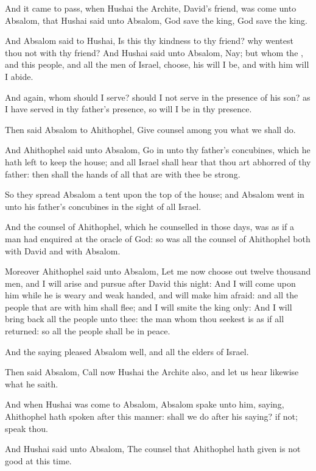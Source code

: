 \Verse And it came to pass, when Hushai the Archite, David's friend, was come unto Absalom, that Hushai said unto Absalom, God save the king, God save the king.

\Verse And Absalom said to Hushai, Is this thy kindness to thy friend?  why wentest thou not with thy friend?  \Verse And Hushai said unto Absalom, Nay; but whom the \LORD, and this people, and all the men of Israel, choose, his will I be, and with him will I abide.

\Verse And again, whom should I serve? should I not serve in the presence of his son? as I have served in thy father's presence, so will I be in thy presence.

\Verse Then said Absalom to Ahithophel, Give counsel among you what we shall do.

\Verse And Ahithophel said unto Absalom, Go in unto thy father's concubines, which he hath left to keep the house; and all Israel shall hear that thou art abhorred of thy father: then shall the hands of all that are with thee be strong.

\Verse So they spread Absalom a tent upon the top of the house; and Absalom went in unto his father's concubines in the sight of all Israel.

\Verse And the counsel of Ahithophel, which he counselled in those days, was as if a man had enquired at the oracle of God: so was all the counsel of Ahithophel both with David and with Absalom.


\Chapter
\Verse Moreover Ahithophel said unto Absalom, Let me now choose out twelve thousand men, and I will arise and pursue after David this night: \Verse And I will come upon him while he is weary and weak handed, and will make him afraid: and all the people that are with him shall flee; and I will smite the king only: \Verse And I will bring back all the people unto thee: the man whom thou seekest is as if all returned: so all the people shall be in peace.

\Verse And the saying pleased Absalom well, and all the elders of Israel.

\Verse Then said Absalom, Call now Hushai the Archite also, and let us hear likewise what he saith.

\Verse And when Hushai was come to Absalom, Absalom spake unto him, saying, Ahithophel hath spoken after this manner: shall we do after his saying? if not; speak thou.

\Verse And Hushai said unto Absalom, The counsel that Ahithophel hath given is not good at this time.

